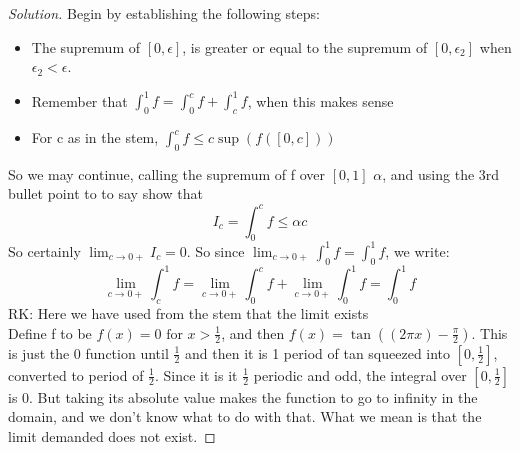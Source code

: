 \documentclass{article}
\newenvironment{problem}[2][Problem]{\begin{trivlist}
\item[\hskip \labelsep {\bfseries #1}\hskip \labelsep {\bfseries #2.}]}{\end{trivlist}}
\newenvironment{solution}{\begin{proof}[Solution]}{\end{proof}}
\begin{document}
\begin{problem}{6.7}
\end{problem}

\begin{solution}
	Begin by establishing the following steps: 
	\begin{itemize}
		\item The supremum of $[0,\epsilon]$, is greater or equal to the supremum of $[0, \epsilon_{2}]$ when $\epsilon_{2}<\epsilon$.
		\item	Remember that $\int_{0}^{1}f = \int_{0}^{c}f + \int_{c}^{1}f$, when this makes sense
			\item For c as in the stem, $\int_{0}^{c}f \leq c\sup (f([0,c]))$
	\end{itemize}
	So we may continue, calling the supremum of f over $[0,1]$ $\alpha$, and using the 3rd bullet point to to say show that \[
		I_{c} =	 \int_{0}^{c}f \leq \alpha c
	\]
	So certainly $\lim_{c \to 0+}   I_{c} = 0$. So since $\lim_{c \to 0+}  \int_{0}^{1}f = \int_{0}^{1}f$, we write: \[
		\lim_{ c \to 0+}\int_{c}^{1}  f = \lim_{c \to 0+} \int_{0}^{c}f + \lim_{ c\to 0+} \int_{0}^{1}f  = \int_{0}^{1}f        
	\]   RK: Here we have used from the stem that the limit exists
\\
Define f to be $f(x) = 0 \text{ for } x>\frac{1}{2}$, and then $f(x) = \tan((2\pi x) - \frac{\pi}{2})$. This is just the 0 function until $\frac{1}{2}$ and then it is 1 period of tan squeezed into $[0,\frac{1}{2}]$, converted to period of $\frac{1}{2}$. Since it is it $\frac{1}{2}$ periodic and odd, the integral over $[0, \frac{1}{2}]$ is 0. But taking its absolute value makes the function to go to infinity in the domain, and we don't know what to do with that. What we mean is that the limit demanded does not exist.
\end{solution}

\begin{problem}{1}
\end{problem}
\end{document}
